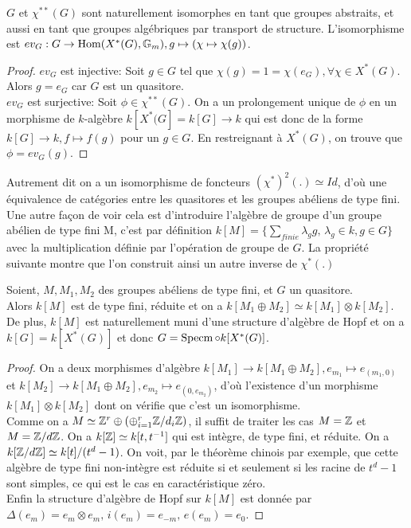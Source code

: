\begin{prop}
$G$ et $\chi^{**}(G)$ sont naturellement isomorphes en tant que groupes abstraits, et aussi en tant que groupes algébriques par transport de structure. L'isomorphisme est $ev_G:G\rightarrow \operatorname{Hom} (X^*(G),\mathbb{G} _m), g\mapsto (\chi\mapsto \chi(g))$.
\end{prop}
\begin{proof}
$ev_G$ est injective: Soit $g\in G$ tel que $\chi(g)=1=\chi(e_G),\forall \chi\in X^*(G)$. Alors $g=e_G$ car $G$ est un quasitore.\\
$ev_G$ est surjective: Soit $\phi\in\chi^{**}(G)$. On a un prolongement unique de $\phi$ en un morphisme de $k$-algèbre $k[X^*(G]=k[G]\rightarrow k$ qui est donc de la forme $k[G]\rightarrow k, f\mapsto f(g)$ pour un $g\in G$. En restreignant à $X^*(G)$, on trouve que $\phi=ev_G(g)$.
\end{proof}

Autrement dit on a un isomorphisme de foncteurs $(\chi^*)^2(.)\simeq Id$, d'où une équivalence de catégories entre les quasitores et les groupes abéliens de type fini. Une autre façon de voir cela est d'introduire l'algèbre de groupe d'un groupe abélien de type fini M, c'est par définition $k[M]=\lbrace \sum_{finie} \lambda_gg,\,\lambda_g\in k,g\in G \rbrace$ avec la multiplication définie par l'opération de groupe de $G$. La propriété suivante montre que l'on construit ainsi un autre inverse de $\chi^*(.)$
\begin{prop}
Soient, $M, M_1, M_2$ des groupes abéliens de type fini, et $G$ un quasitore.\\
Alors $k[M]$ est de type fini, réduite et on a $k[M_1\oplus M_2]\simeq k[M_1]\otimes k[M_2]$. De plus, $k[M]$ est naturellement muni d'une structure d'algèbre de Hopf et on a $k[G]=k[X^*(G)]$ et donc $G=\operatorname{Specm}\circ k[X^*(G)]$.
\end{prop}
\begin{proof}
On a deux morphismes d'algèbre $k[M_1]\rightarrow k[M_1\oplus M_2], e_{m_1}\mapsto e_{(m_1,0)}$ et $k[M_2]\rightarrow k[M_1\oplus M_2], e_{m_2}\mapsto e_{(0,e_{m_2})}$, d'où l'existence d'un morphisme $k[M_1]\otimes k[M_2]$ dont on vérifie que c'est un isomorphisme.\\
Comme on a $M\simeq \mathbb{Z}^r\oplus (\oplus_{i=1}^r \mathbb{Z}/d_i\mathbb{Z})$, il suffit de traiter les cas $M=\mathbb{Z}$ et $M=\mathbb{Z}/d\mathbb{Z}$. On a $k[\mathbb{Z}]\simeq k[t,t^{-1}]$ qui est intègre, de type fini, et réduite. On a $k[\mathbb{Z}/d\mathbb{Z}]\simeq k[t]/(t^d-1)$. On voit, par le théorème chinois par exemple, que cette algèbre de type fini non-intègre est réduite si et seulement si les racine de $t^d-1$ sont simples, ce qui est le cas en caractéristique zéro.\\
Enfin la structure d'algèbre de Hopf sur $k[M]$ est donnée par $\Delta(e_m)=e_m\otimes e_m,\, i(e_m)=e_{-m},\, e(e_m)=e_0$.
\end{proof}

